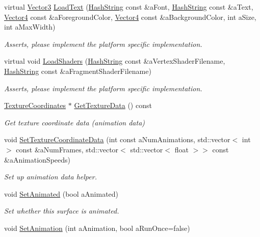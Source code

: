\begin{DoxyCompactItemize}
virtual \hyperlink{structVector3}{Vector3} \hyperlink{classSurface_a1d80ab9d8946932c2ffb2788728f3263}{Load\+Text} (\hyperlink{classHashString}{Hash\+String} const \&a\+Font, \hyperlink{classHashString}{Hash\+String} const \&a\+Text, \hyperlink{structVector4}{Vector4} const \&a\+Foreground\+Color, \hyperlink{structVector4}{Vector4} const \&a\+Background\+Color, int a\+Size, int a\+Max\+Width)
\begin{DoxyCompactList}\small\item\em Asserts, please implement the platform specific implementation. \end{DoxyCompactList}\item 
virtual void \hyperlink{classSurface_ab01df27c2a91269a97773cb1df1c0f14}{Load\+Shaders} (\hyperlink{classHashString}{Hash\+String} const \&a\+Vertex\+Shader\+Filename, \hyperlink{classHashString}{Hash\+String} const \&a\+Fragment\+Shader\+Filename)
\begin{DoxyCompactList}\small\item\em Asserts, please implement the platform specific implementation. \end{DoxyCompactList}\item 
\hyperlink{classTextureCoordinates}{Texture\+Coordinates} $\ast$ \hyperlink{classSurface_a394ba021f319e09c882ac50f4bfd7a95}{Get\+Texture\+Data} () const 
\begin{DoxyCompactList}\small\item\em Get texture coordinate data (animation data) \end{DoxyCompactList}\item 
void \hyperlink{classSurface_abdf13f4b9824c89984c0c1b0c47ca2ed}{Set\+Texture\+Coordinate\+Data} (int const a\+Num\+Animations, std\+::vector$<$ int $>$ const \&a\+Num\+Frames, std\+::vector$<$ std\+::vector$<$ float $>$$>$ const \&a\+Animation\+Speeds)
\begin{DoxyCompactList}\small\item\em Set up animation data helper. \end{DoxyCompactList}\item 
void \hyperlink{classSurface_abd4dc8878b22e5305399d136ed2d8ca1}{Set\+Animated} (bool a\+Animated)
\begin{DoxyCompactList}\small\item\em Set whether this surface is animated. \end{DoxyCompactList}\item 
void \hyperlink{classSurface_ae300aa7884ccec3af3177350acb9a663}{Set\+Animation} (int a\+Animation, bool a\+Run\+Once=false)
$$
\end{DoxyCompactItemize}
